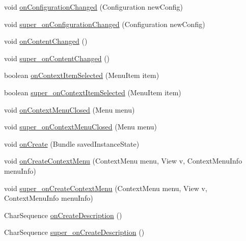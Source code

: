 \begin{DoxyCompactItemize}
\item 
void \hyperlink{classorg_1_1kde_1_1necessitas_1_1origo_1_1_qt_activity_a46e6b2dd30d2af1c4b4002c21f9b7c43}{on\-Configuration\-Changed} (Configuration new\-Config)
\item 
void \hyperlink{classorg_1_1kde_1_1necessitas_1_1origo_1_1_qt_activity_adcf3eb25c3fb084f7a52e9e4abadf025}{super\-\_\-on\-Configuration\-Changed} (Configuration new\-Config)
\item 
void \hyperlink{classorg_1_1kde_1_1necessitas_1_1origo_1_1_qt_activity_abbe93805dc7145f00d662bfaa6b43da0}{on\-Content\-Changed} ()
\item 
void \hyperlink{classorg_1_1kde_1_1necessitas_1_1origo_1_1_qt_activity_a4ec1c02183a33a69ad0cb25666bc738c}{super\-\_\-on\-Content\-Changed} ()
\item 
boolean \hyperlink{classorg_1_1kde_1_1necessitas_1_1origo_1_1_qt_activity_a9f5e5fe637cd0d2d59950f57043e700d}{on\-Context\-Item\-Selected} (Menu\-Item item)
\item 
boolean \hyperlink{classorg_1_1kde_1_1necessitas_1_1origo_1_1_qt_activity_a8857e0c301825621f3a0d3cde475592b}{super\-\_\-on\-Context\-Item\-Selected} (Menu\-Item item)
\item 
void \hyperlink{classorg_1_1kde_1_1necessitas_1_1origo_1_1_qt_activity_abd19dc275b123e450280eb89fd426f6d}{on\-Context\-Menu\-Closed} (Menu menu)
\item 
void \hyperlink{classorg_1_1kde_1_1necessitas_1_1origo_1_1_qt_activity_ac571bfef1242e6d8861a9cfbb5f696e0}{super\-\_\-on\-Context\-Menu\-Closed} (Menu menu)
\item 
void \hyperlink{classorg_1_1kde_1_1necessitas_1_1origo_1_1_qt_activity_a1698da7cf3dc0ff8e1180f301e2ef1b0}{on\-Create} (Bundle saved\-Instance\-State)
\item 
void \hyperlink{classorg_1_1kde_1_1necessitas_1_1origo_1_1_qt_activity_a73f190d875fd80aafd0f281191ca0b7d}{on\-Create\-Context\-Menu} (Context\-Menu menu, View v, Context\-Menu\-Info menu\-Info)
\item 
void \hyperlink{classorg_1_1kde_1_1necessitas_1_1origo_1_1_qt_activity_a3da5e238ee78be8e0649c85e6070575b}{super\-\_\-on\-Create\-Context\-Menu} (Context\-Menu menu, View v, Context\-Menu\-Info menu\-Info)
\item 
Char\-Sequence \hyperlink{classorg_1_1kde_1_1necessitas_1_1origo_1_1_qt_activity_ad965b0bf539d8503de3e3784fa9676a7}{on\-Create\-Description} ()
\item 
Char\-Sequence \hyperlink{classorg_1_1kde_1_1necessitas_1_1origo_1_1_qt_activity_a5d58d6128ad12b9480a9bbd7b1f52a11}{super\-\_\-on\-Create\-Description} ()

\end{DoxyCompactItemize}
